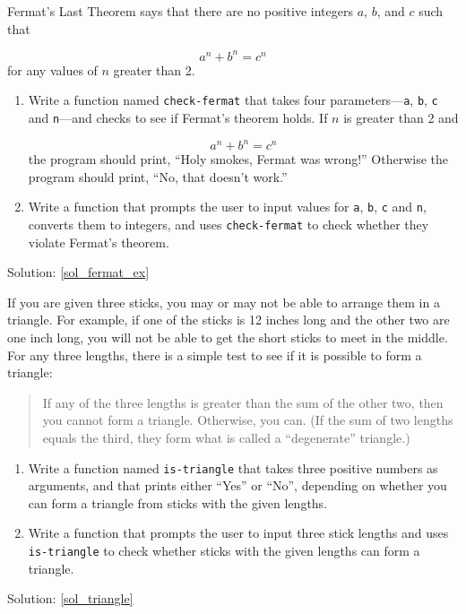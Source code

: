 \begin{exercise}
\label{fermat_ex}

Fermat's Last Theorem says that there are no positive integers
$a$, $b$, and $c$ such that

\[ a^n + b^n = c^n \]
%
for any values of $n$ greater than 2.

\begin{enumerate}

\item Write a function named \verb"check-fermat" that takes four
parameters---{\tt a}, {\tt b}, {\tt c} and {\tt n}---and
checks to see if Fermat's theorem holds.  If
$n$ is greater than 2 and 

\[a^n + b^n = c^n \]
%
the program should print, ``Holy smokes, Fermat was wrong!''
Otherwise the program should print, ``No, that doesn't work.''

\item Write a function that prompts the user to input values
for {\tt a}, {\tt b}, {\tt c} and {\tt n}, converts them to
integers, and uses \verb"check-fermat" to check whether they
violate Fermat's theorem.
\end{enumerate}

Solution: \ref{sol_fermat_ex}


\end{exercise}


\begin{exercise}
\label{triangle}

If you are given three sticks, you may or may not be able to arrange
them in a triangle.  For example, if one of the sticks is 12 inches
long and the other two are one inch long, you will
not be able to get the short sticks to meet in the middle.  For any
three lengths, there is a simple test to see if it is possible 
to form a triangle:

\begin{quotation}
If any of the three lengths is greater than the sum of the other
  two, then you cannot form a triangle.  Otherwise, you
  can.  (If the sum of two lengths equals the third, they form
    what is called a ``degenerate'' triangle.)
\end{quotation}

\begin{enumerate}

\item Write a function named \verb"is-triangle" that takes three
positive numbers as arguments, and that prints either 
``Yes'' or ``No'', depending on whether you can 
form a triangle from sticks with the given lengths.

\item Write a function that prompts the user to input 
three stick lengths and uses \verb"is-triangle" to check 
whether sticks with the given lengths can form a triangle.

\end{enumerate}

Solution: \ref{sol_triangle}


\end{exercise}

